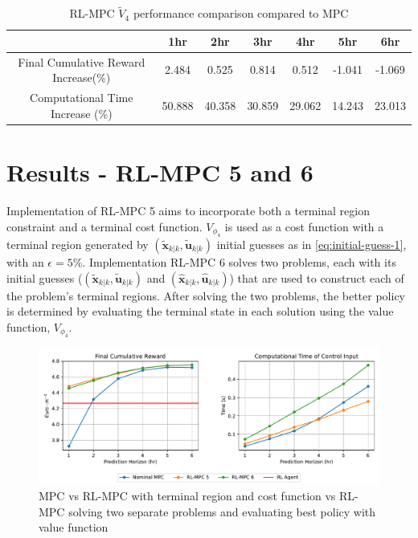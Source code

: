 \begin{table}[H]
	\centering
	\begin{tabular}{|c|cccccc|}
		\hline
		&1hr&2hr&3hr&4hr&5hr&6hr\\
		\hline
		Final Cumulative Reward Increase(\%) &2.484 &0.525&0.814&0.512&-1.041& -1.069\\
		\hline
		Computational Time Increase     (\%) &50.888 &40.358&30.859&29.062&14.243& 23.013\\
		\hline
	\end{tabular}
	\caption{RL-MPC $\tilde{V}_4$ performance comparison compared to MPC}
	\label{tab:rl-mpc-v4}
\end{table}

\section{Results - RL-MPC 5 and 6}

Implementation of RL-MPC 5 aims to incorporate both a terminal region constraint and a terminal cost function. ${V}_{\phi_4}$ is used as a cost function with a terminal region generated by $(\tilde{\mathbf{x}}_{k|k},\tilde{\mathbf{u}}_{k|k})$ initial guesses as in \autoref{eq:initial-guess-1}, with an $\epsilon =5\%$. Implementation RL-MPC 6 solves two problems, each with its initial guesses ($(\tilde{\mathbf{x}}_{k|k},\tilde{\mathbf{u}}_{k|k})$ and $(\hat{\mathbf{x}}_{k|k},\hat{\mathbf{u}}_{k|k})$) that are used to construct each of the problem's terminal regions. After solving the two problems, the better policy is determined by evaluating the terminal state in each solution using the value function, ${V}_{\phi_4}$.

\begin{figure}[H]
	\centering
	\includegraphics[width=\textwidth]{figures/rl_mpc_impl_5_6.pdf}
	\caption{MPC vs RL-MPC with terminal region and cost function vs RL-MPC solving two separate problems and evaluating best policy with value function}
	\label{fig:rlmpc-impl5-6}
\end{figure}

